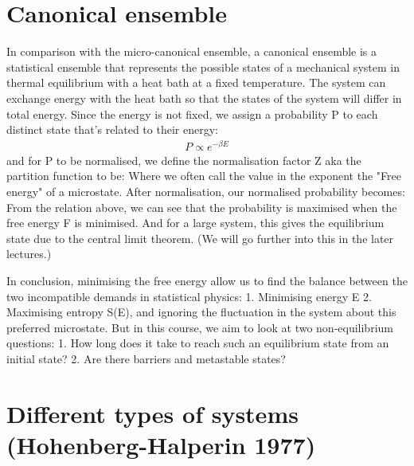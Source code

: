\documentclass{report}
\begin{document}
\section{Canonical ensemble}
In comparison with the micro-canonical ensemble, a canonical ensemble is a statistical ensemble that represents the possible states of a mechanical system in thermal equilibrium with a heat bath at a fixed temperature. The system can exchange energy with the heat bath so that the states of the system will differ in total energy. Since the energy is not fixed, we assign a probability P to each distinct state that's related to their energy:
\begin{align}
    P \propto e^{-\beta E}
\end{align}
\noindent and for P to be normalised, we define the normalisation factor Z aka the partition function to be:
\noindent Where we often call the value in the exponent the "Free energy" of a microstate.
\noindent After normalisation, our normalised probability becomes:
\noindent From the relation above, we can see that the probability is maximised when the free energy F is minimised. And for a large system, this gives the equilibrium state due to the central limit theorem. (We will go further into this in the later lectures.)

In conclusion, minimising the free energy allow us to find the balance between the two incompatible demands in statistical physics: 1. Minimising energy E 2. Maximising entropy S(E), and ignoring the fluctuation in the system about this preferred microstate. But in this course, we aim to look at two non-equilibrium questions: 1. How long does it take to reach such an equilibrium state from an initial state? 2. Are there barriers and metastable states?
\section{Different types of systems (Hohenberg-Halperin 1977)}
\end{document}
